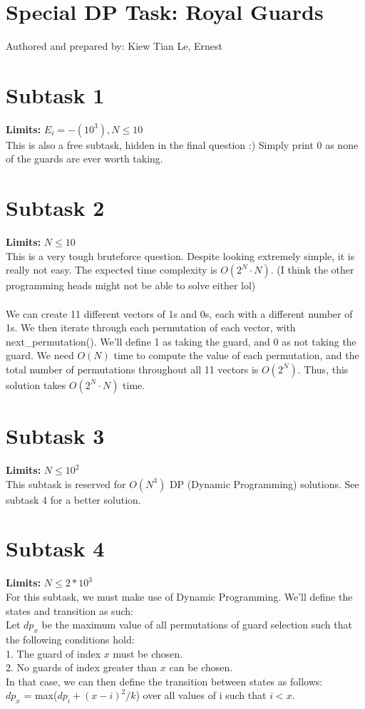 \documentclass{report}
\begin{document}
\section*{Special DP Task: Royal Guards}
Authored and prepared by: Kiew Tian Le, Ernest

\section*{Subtask 1}
\textbf{Limits: } $E_i = -(10^3), N \leq 10$\\
This is also a free subtask, hidden in the final question :)
Simply print 0 as none of the guards are ever worth taking.

\section*{Subtask 2}
\textbf{Limits: } $N \leq 10$\\
This is a very tough bruteforce question. Despite looking extremely simple, it is really not easy. The expected time complexity is $O(2^N \cdot N)$. (I think the other programming heads might not be able to solve either lol)\\\\

We can create 11 different vectors of 1s and 0s, each with a different number of 1s. We then iterate through each permutation of each vector, with next\_permutation(). We'll define 1 as taking the guard, and 0 as not taking the guard. We need $O(N)$ time to compute the value of each permutation, and the total number of permutations throughout all 11 vectors is $O(2^N)$. Thus, this solution takes $O(2^N \cdot N)$ time.

\section*{Subtask 3}
\textbf{Limits: } $N \leq 10^2$\\
This subtask is reserved for $O(N^3)$ DP (Dynamic Programming) solutions. See subtask 4 for a better solution.

\section*{Subtask 4}
\textbf{Limits: } $N \leq 2*10^3$\\
For this subtask, we must make use of Dynamic Programming. We'll define the states and transition as such:\\
Let $dp_x$ be the maximum value of all permutations of guard selection such that the following conditions hold:\\
1. The guard of index $x$ must be chosen.\\
2. No guards of index greater than $x$ can be chosen.\\
In that case, we can then define the transition between states as follows:\\
$dp_x$ = max($dp_i + (x-i)^2/k$) over all values of i such that $i < x$.\\
\end{document}

